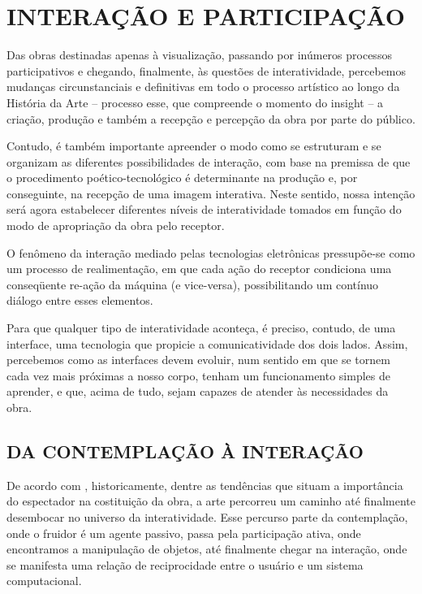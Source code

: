 \chapter{INTERAÇÃO E PARTICIPAÇÃO}

Das obras destinadas apenas à visualização, passando por inúmeros processos participativos e chegando, finalmente, às questões de interatividade, percebemos mudanças circunstanciais e definitivas em todo o processo artístico ao longo da História da Arte – processo esse, que compreende o momento do insight – a criação, produção e também a recepção e percepção da obra por parte do público. \cite{vares} 

Contudo, é também importante apreender o modo como se estruturam e se organizam
as diferentes possibilidades de interação, com base na premissa de que o procedimento
poético-tecnológico é determinante na produção e, por conseguinte, na recepção de uma
imagem interativa. Neste sentido, nossa intenção será agora estabelecer diferentes níveis de interatividade tomados em função do modo de apropriação da obra pelo receptor. \cite{tavares}

O fenômeno da interação mediado pelas tecnologias eletrônicas pressupõe-se como
um processo de realimentação, em que cada ação do receptor condiciona uma conseqüente
re-ação da máquina (e vice-versa), possibilitando um contínuo diálogo entre esses elementos. \cite{tavares}


Para que qualquer tipo de interatividade aconteça, é preciso, contudo, de uma interface, uma tecnologia que propicie a comunicatividade dos dois lados. Assim, percebemos como as interfaces devem evoluir, num sentido em que se tornem cada vez mais próximas a nosso corpo, tenham um funcionamento simples de aprender, e que, acima de tudo, sejam capazes de atender às necessidades da obra. \cite{witt}


\section{DA CONTEMPLAÇÃO À INTERAÇÃO}

De acordo com , historicamente, dentre as tendências que situam a importância do espectador na costituição da obra, a arte percorreu um caminho até finalmente desembocar no universo da interatividade. Esse percurso parte da contemplação, onde o fruidor é um agente passivo, passa pela participação ativa, onde encontramos a manipulação de objetos, até finalmente chegar na interação, onde se manifesta uma relação de reciprocidade entre o usuário e um sistema computacional. 

